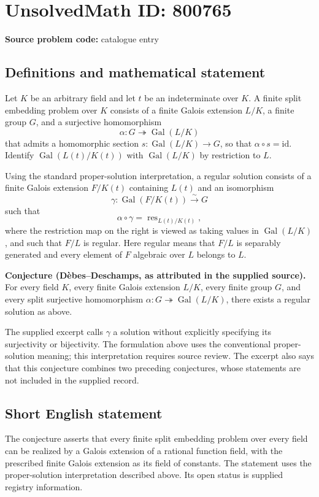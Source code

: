 \documentclass[11pt]{article}
\begin{document}
\section*{UnsolvedMath ID: 800765}
\textbf{Source problem code:} catalogue entry
\subsection{Definitions and mathematical statement}
Let \(K\) be an arbitrary field and let \(t\) be an indeterminate over \(K\). A finite split embedding problem over \(K\) consists of a finite Galois extension \(L/K\), a finite group \(G\), and a surjective homomorphism
\[
\alpha:G\twoheadrightarrow\operatorname{Gal}(L/K)
\]
that admits a homomorphic section \(s:\operatorname{Gal}(L/K)\to G\), so that \(\alpha\circ s=\mathrm{id}\). Identify \(\operatorname{Gal}(L(t)/K(t))\) with \(\operatorname{Gal}(L/K)\) by restriction to \(L\).

Using the standard proper-solution interpretation, a regular solution consists of a finite Galois extension \(F/K(t)\) containing \(L(t)\) and an isomorphism
\[
\gamma:\operatorname{Gal}(F/K(t))\xrightarrow{\sim}G
\]
such that
\[
\alpha\circ\gamma
=\operatorname{res}_{L(t)/K(t)},
\]
where the restriction map on the right is viewed as taking values in \(\operatorname{Gal}(L/K)\), and such that \(F/L\) is regular. Here regular means that \(F/L\) is separably generated and every element of \(F\) algebraic over \(L\) belongs to \(L\).

\textbf{Conjecture (D\`ebes--Deschamps, as attributed in the supplied source).} For every field \(K\), every finite Galois extension \(L/K\), every finite group \(G\), and every split surjective homomorphism \(\alpha:G\twoheadrightarrow\operatorname{Gal}(L/K)\), there exists a regular solution as above.

The supplied excerpt calls \(\gamma\) a solution without explicitly specifying its surjectivity or bijectivity. The formulation above uses the conventional proper-solution meaning; this interpretation requires source review. The excerpt also says that this conjecture combines two preceding conjectures, whose statements are not included in the supplied record.
\subsection{Short English statement}
The conjecture asserts that every finite split embedding problem over every field can be realized by a Galois extension of a rational function field, with the prescribed finite Galois extension as its field of constants. The statement uses the proper-solution interpretation described above. Its open status is supplied registry information.
\end{document}
